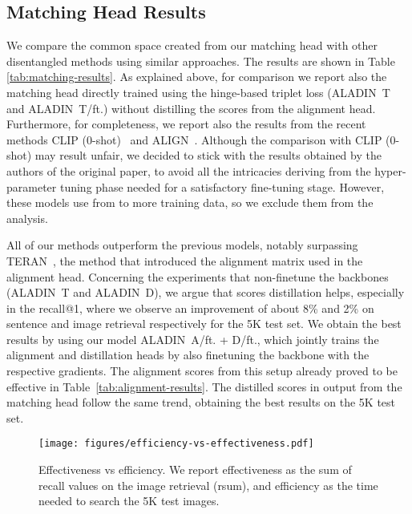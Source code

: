 \documentclass[sigconf]{acmart}
\newcommand{\ourmodel}{ALADIN}    \settopmatter{authorsperrow=4}
\begin{document}
\subsection{Matching Head Results}
We compare the common space created from our matching head with other disentangled methods using similar approaches. The results are shown in Table \ref{tab:matching-results}. As explained above, for comparison we report also the matching head directly trained using the hinge-based triplet loss (\ourmodel\ T and \ourmodel\ T/ft.) without distilling the scores from the alignment head. Furthermore, for completeness, we report also the results from the recent methods CLIP (0-shot)~\citep{radford2021learning} and ALIGN~\citep{jia2021scaling}. Although the comparison with CLIP (0-shot) may result unfair, we decided to stick with the results obtained by the authors of the original paper, to avoid all the intricacies deriving from the hyper-parameter tuning phase needed for a satisfactory fine-tuning stage. However, these models use from  to  more training data, so we exclude them from the analysis.

All of our methods outperform the previous models, notably surpassing TERAN~\citep{messina2021fine}, the method that introduced the alignment matrix used in the alignment head. Concerning the experiments that non-finetune the backbones (\ourmodel\ T and \ourmodel\ D), we argue that scores distillation helps, especially in the recall@1, where we observe an improvement of about 8\% and 2\% on sentence and image retrieval respectively for the 5K test set. 
We obtain the best results by using our model \ourmodel\ A/ft. + D/ft., which jointly trains the alignment and distillation heads by also finetuning the backbone with the respective gradients. The alignment scores from this setup already proved to be effective in Table~\ref{tab:alignment-results}. The distilled scores in output from the matching head follow the same trend, obtaining the best results on the 5K test set.

\begin{figure}[t]
  \centering
  \texttt{[image: figures/efficiency-vs-effectiveness.pdf]}
  \caption{Effectiveness vs efficiency. We report effectiveness as the sum of recall values on the image retrieval (rsum), and efficiency as the time needed to search the 5K test images.}
  \label{fig:effectiveness-vs-efficiency}
\end{figure}
\end{document}
